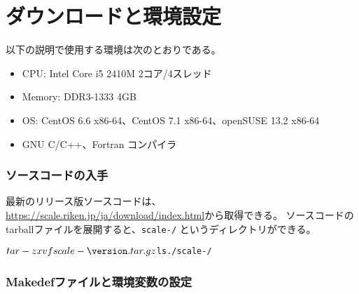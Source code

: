 
\section{ダウンロードと環境設定} \label{sec:download}

以下の説明で使用する環境は次のとおりである。
\begin{itemize}
\item CPU: Intel Core i5 2410M 2コア/4スレッド
\item Memory: DDR3-1333 4GB
\item OS: CentOS 6.6 x86-64、CentOS 7.1 x86-64、openSUSE 13.2 x86-64
\item GNU C/C++、Fortran コンパイラ
\end{itemize}

\subsubsection{ソースコードの入手} \label{subsec:get_source_code}
最新のリリース版ソースコードは、\url{https://scale.riken.jp/ja/download/index.html}から取得できる。
ソースコードのtarballファイルを展開すると、\texttt{scale-{\version}/} というディレクトリができる。
\begin{alltt}
 $ tar -zxvf scale-{\version}.tar.gz
 $ ls ./scale-{\version}/
\end{alltt}

\subsubsection{Makedefファイルと環境変数の設定} \label{subsec:environment}

